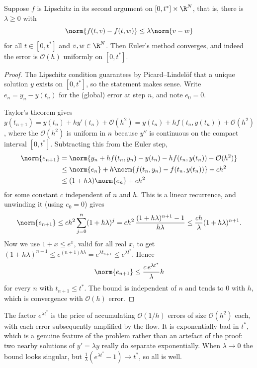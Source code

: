 \begin{theorem}\label{thm:eulerconv}
  Suppose $f$ is Lipschitz in its second argument on $[0,t^*] \times \R^N$, that is, there is $\lambda \geq 0$ with
  $$
  \norm{f(t,v) - f(t,w)} \leq \lambda \norm{v - w}
  $$
  for all $t \in [0,t^*]$ and $v, w \in \R^N$. Then Euler's method converges, and indeed the error is $\mathcal{O}(h)$ uniformly on $[0,t^*]$.
\end{theorem}
\begin{proof}
  The Lipschitz condition guarantees by Picard--Lindel\"of that a unique solution $y$ exists on $[0, t^*]$, so the statement makes sense. Write $e_n = y_n - y(t_n)$ for the (global) error at step $n$, and note $e_0 = 0$.

  Taylor's theorem gives $y(t_{n+1}) = y(t_n) + hy'(t_n) + \mathcal{O}(h^2) = y(t_n) + hf(t_n, y(t_n)) + \mathcal{O}(h^2)$, where the $\mathcal{O}(h^2)$ is uniform in $n$ because $y''$ is continuous on the compact interval $[0,t^*]$. Subtracting this from the Euler step,
  \begin{align*}
    \norm{e_{n+1}} &= \norm{y_n + hf(t_n,y_n) - y(t_n) - hf(t_n, y(t_n)) - \mathcal{O}(h^2)}\\
    &\leq \norm{e_n} + h\norm{f(t_n,y_n) - f(t_n,y(t_n))} + ch^2\\
    &\leq (1 + h\lambda)\norm{e_n} + ch^2
  \end{align*}
  for some constant $c$ independent of $n$ and $h$. This is a linear recurrence, and unwinding it (using $e_0 = 0$) gives
  $$
  \norm{e_{n+1}} \leq ch^2\sum_{j=0}^{n}(1+h\lambda)^j = ch^2\,\frac{(1+h\lambda)^{n+1} - 1}{h\lambda} \leq \frac{ch}{\lambda}(1 + h\lambda)^{n+1}.
  $$
  Now we use $1 + x \leq e^x$, valid for all real $x$, to get $(1+h\lambda)^{n+1} \leq e^{(n+1)h\lambda} = e^{\lambda t_{n+1}} \leq e^{\lambda t^*}$. Hence
  $$
  \norm{e_{n+1}} \leq \frac{c\,e^{\lambda t^*}}{\lambda}h
  $$
  for every $n$ with $t_{n+1} \le t^*$. The bound is independent of $n$ and tends to $0$ with $h$, which is convergence with $\mathcal{O}(h)$ error.
\end{proof}

\begin{remark}
  The factor $e^{\lambda t^*}$ is the price of accumulating $\mathcal{O}(1/h)$ errors of size $\mathcal{O}(h^2)$ each, with each error subsequently amplified by the flow. It is exponentially bad in $t^*$, which is a genuine feature of the problem rather than an artefact of the proof: two nearby solutions of $y' = \lambda y$ really do separate exponentially. When $\lambda \to 0$ the bound looks singular, but $\frac{1}{\lambda}(e^{\lambda t^*} - 1) \to t^*$, so all is well.
\end{remark}

